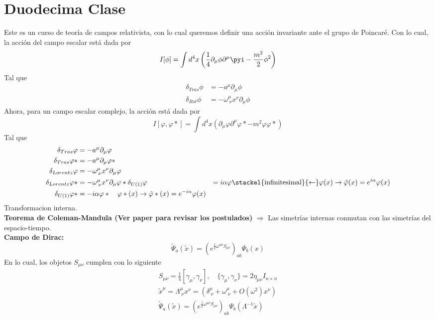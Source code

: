 \documentclass[../main.tex]{subfiles}
\begin{document}
\section{Duodecima Clase}
Este es un curso de teoría de campos relativista, con lo cual queremos definir una acción invariante ante el grupo de Poincaré. Con lo cual, la acción del campo escalar está dada por
\begin{equation}
  I[\phi] = \int d^4x \left( \frac{1}{4} \partial_\mu \phi \partial^\mu \pyi - \frac{m^2}{2}\phi^2 \right)
 \end{equation}
 Tal que
 \begin{align}
   \delta_{Tras} \phi & = -a^\mu \partial_\mu \phi \\
   \delta_{Rot}  \phi & = -\omega^\mu_{\; \nu} x^\nu \partial_\mu \phi
 \end{align}
 Ahora, para un campo escalar complejo, la acción está dada por
 \begin{equation}
   I[\varphi , \varphi*] = \int d^4x \left( \partial_\mu \varphi \partial^\mu \varphi* - m^2 \varphi \varphi* \right)
  \end{equation}
  Tal que
  \begin{align}
    \delta_{Tras} \varphi  & = -a^\mu\partial_\mu \varphi \\
    \delta_{Tras} \varphi* & = -a^\mu \partial_\mu \varphi* \\
    \delta_{Lorentz} \varphi & = -\omega^\mu_{\; \nu} x^\nu \partial_\mu \varphi \\
    \delta_{Lorentz} \varphi* & = -\omega^\mu_{\; \nu} x^\nu \partial_\mu \varphi*
    \delta_{U(1)} \varphi & = i\alpha \varphi \stackel{\text{infinitesimal}}{\leftarrow} \varphi(x)\rightarrow \tilde{\varphi}(x) = e^{i\alpha} \varphi(x) \\
    \delta_{U(1)} \varphi* & = -i\alpha \varphi* \quad \varphi* (x) \rightarrow \tilde{\varphi}*(x) = e^{-i\alpha}\varphi(x)
  \end{align}
Transformacion interna. \\
\textbf{Teorema de Coleman-Mandula (Ver paper para revisar los postulados)} $\Rightarrow$ Las simetrías internas conmutan con las simetrías del espacio-tiempo. \\
\textbf{Campo de Dirac:} 
\begin{equation*}
  \tilde{\Psi}_a (\tilde{x}) = \left( e^{\frac{1}{2}\omega^{\mu \nu}S_{\mu \nu}} \right)_{ab} \Psi_b(x)
\end{equation*}
En lo cual, los objetos $S_{\mu \nu}$ cumplen con lo siguiente
\begin{align*}
  S_{\mu \nu} = \frac{1}{4} \left[ \gamma_\mu , \gamma_\nu \right] , \quad \{\gamma_\mu , \gamma_\nu\} = 2\eta_{\mu \nu} I_{n\times n } \\
  \tilde{x}^\mu = \Lambda^\mu_{\; \nu} x^\nu = \left( \delta^\mu_{\; \nu} + \omega^\mu_{\; \nu} + O(\omega^2)x^\nu \right) \\
  \tilde{\Psi}_a(\tilde{x}) = \left( e^{\frac{1}{2}\omega^{\mu \nu} S_{\mu \nu}} \right)_{ab}\Psi_b(\Lambda^{-1}\tilde{x})
\end{align*}
\end{document}
